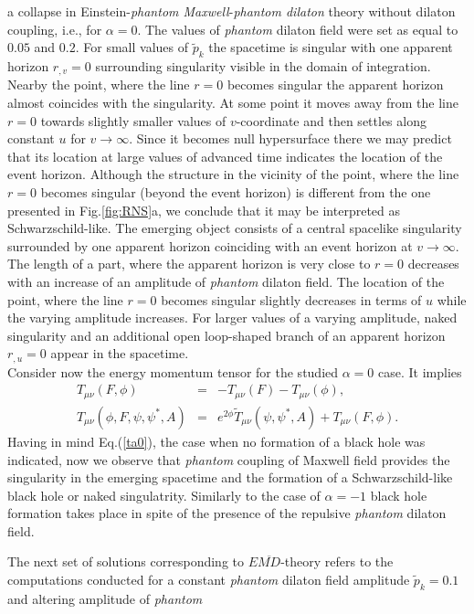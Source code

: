 \documentclass[aps,showpacs,nofootinbib,floatfix]{revtex4}
\newcommand{\ben}{\begin{eqnarray}}
\newcommand{\een}{\end{eqnarray}}
\newcommand{\tpe}{{\tilde p}}
\newcommand{\tT}{\tilde T}
\newcommand{\zpsi}{\psi^{\ast}}
\begin{document}
a collapse in Einstein-{\it phantom Maxwell}-{\it phantom dilaton} 
theory without dilaton coupling, i.e., for $\alpha = 0$. The values of {\it phantom} dilaton
field were set as equal to $0.05$ and $0.2$.
For small values of $\tpe_k$ the spacetime is singular with one apparent horizon $r_{,v}=0$ surrounding singularity 
visible in the domain of integration. Nearby the 
point, where the line $r=0$ becomes singular the apparent horizon almost coincides with the singularity. 
At some point it moves away from the line $r=0$ towards slightly smaller values of 
$v$-coordinate and then settles along constant $u$ for $v\rightarrow\infty$. 
Since it becomes null hypersurface there we may predict 
that its location at large values of advanced time 
indicates the location of the event horizon. 
Although the structure in the vicinity of the point, where the line $r=0$ 
becomes singular (beyond the event horizon) is different from the one presented in Fig.\ref{fig:RNS}a, we 
conclude that it may be interpreted as Schwarzschild-like. The emerging 
object consists of a central spacelike singularity surrounded by one apparent horizon 
coinciding with an event horizon at $v\rightarrow\infty$.
The length of a part, where the apparent horizon is very close 
to $r=0$ decreases with an 
increase of an amplitude of {\it phantom} dilaton field. The location of the point, where 
the line $r=0$ becomes singular slightly decreases in terms of $u$ while the varying amplitude increases.
For larger values of a varying amplitude, naked singularity and an additional open 
loop-shaped branch of an apparent horizon $r_{,u}=0$ appear in the spacetime.\\
Consider now the energy momentum tensor for the studied $\alpha = 0$ case. It implies
\ben \label{taa2}
T_{\mu \nu}(F, \phi) &=& - T_{\mu \nu}(F) - T_{\mu \nu}(\phi), \\ \nonumber
T_{\mu \nu}(\phi, F, \psi, \zpsi, A) &=& e^{2 \phi} \tT_{\mu \nu}(\psi, \zpsi, A) + T_{\mu \nu}(F, \phi).
\een
Having in mind Eq.(\ref{ta0}), the case when no formation of a black hole was indicated, now
we observe that {\it phantom} coupling of Maxwell field provides the singularity in the 
emerging spacetime and the formation of a Schwarzschild-like black hole or naked singulatrity. 
Similarly to the case of $\alpha=-1$ black hole formation takes place in spite of the presence of the 
repulsive {\it phantom} dilaton field.
\par
The next set of solutions corresponding to $E\overline{MD}$-theory refers to the computations conducted 
for a constant {\it phantom} dilaton field amplitude $\tpe_k=0.1$ and altering amplitude of {\it phantom} 
\end{document}
